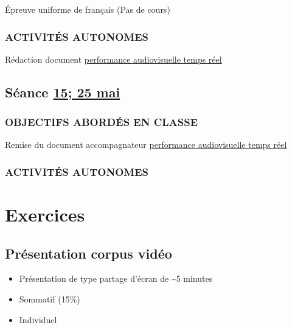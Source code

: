 \documentclass[
  french,
]{book}
\providecommand{\tightlist}{%
  \setlength{\itemsep}{0pt}\setlength{\parskip}{0pt}}
\begin{document}
Épreuve uniforme de français (Pas de cours)

\hypertarget{activituxe9s-autonomes-16}{%
\subsection{ACTIVITÉS AUTONOMES}\label{activituxe9s-autonomes-16}}

Rédaction document \protect\hyperlink{sommatif_5}{performance audiovisuelle temps réel}

\hypertarget{semaine_18}{%
\section{\texorpdfstring{Séance \protect\hyperlink{semaine_18}{15; 25 mai}}{Séance 15; 25 mai}}\label{semaine_18}}

\hypertarget{objectifs-aborduxe9s-en-classe-17}{%
\subsection{OBJECTIFS ABORDÉS EN CLASSE}\label{objectifs-aborduxe9s-en-classe-17}}

Remise du document accompagnateur \protect\hyperlink{sommatif_5}{performance audiovisuelle temps réel}

\hypertarget{activituxe9s-autonomes-17}{%
\subsection{ACTIVITÉS AUTONOMES}\label{activituxe9s-autonomes-17}}

\hypertarget{exercices}{%
\chapter{Exercices}\label{exercices}}

\hypertarget{sommatif_1}{%
\section{Présentation corpus vidéo}\label{sommatif_1}}

\begin{itemize}
\tightlist
\item
  Présentation de type partage d'écran de \textasciitilde5 minutes
\item
  Sommatif (15\%)
\item
  Individuel
\end{itemize}
\end{document}
